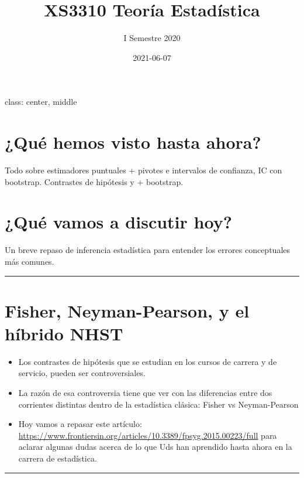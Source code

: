 \documentclass[
]{article}
\title{XS3310 Teoría Estadística}
\subtitle{I Semestre 2020}
\author{}
\date{\vspace{-2.5em}2021-06-07}
\begin{document}
\maketitle

class: center, middle

\hypertarget{quuxe9-hemos-visto-hasta-ahora}{%
\section{¿Qué hemos visto hasta
ahora?}\label{quuxe9-hemos-visto-hasta-ahora}}

Todo sobre estimadores puntuales + pivotes e intervalos de confianza, IC
con bootstrap. Contrastes de hipótesis y + bootstrap.

\hypertarget{quuxe9-vamos-a-discutir-hoy}{%
\section{¿Qué vamos a discutir hoy?}\label{quuxe9-vamos-a-discutir-hoy}}

Un breve repaso de inferencia estadística para entender los errores
conceptuales más comunes.

\begin{center}\rule{0.5\linewidth}{0.5pt}\end{center}

\hypertarget{fisher-neyman-pearson-y-el-huxedbrido-nhst}{%
\section{Fisher, Neyman-Pearson, y el híbrido
NHST}\label{fisher-neyman-pearson-y-el-huxedbrido-nhst}}

\begin{itemize}
\item
  Los contrastes de hipótesis que se estudian en los cursos de carrera y
  de servicio, pueden ser controversiales.
\item
  La razón de esa controversia tiene que ver con las diferencias entre
  dos corrientes distintas dentro de la estadística clásica: Fisher vs
  Neyman-Pearson
\item
  Hoy vamos a repasar este artículo:
  \url{https://www.frontiersin.org/articles/10.3389/fpsyg.2015.00223/full}
  para aclarar algunas dudas acerca de lo que Uds han aprendido hasta
  ahora en la carrera de estadística.
\end{itemize}

\begin{center}\rule{0.5\linewidth}{0.5pt}\end{center}
\end{document}
